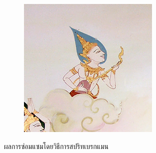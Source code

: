 \begin{figure}[H]
\begin{subfigure}{0.4\linewidth}
        \includegraphics[width=0.8\linewidth]{image/result_ex4/splitbergman_case05.png}			
    \end{subfigure}
    \caption{ผลการซ่อมแซมโดยวิธีการสปริทเบรกแมน}
\end{figure}